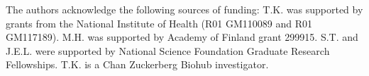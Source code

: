 The authors acknowledge the following sources of funding:
T.K. was supported by grants from the National Institute of Health (R01 GM110089 and R01 GM117189).
M.H. was supported by Academy of Finland grant 299915.
S.T. and J.E.L. were supported by National Science Foundation Graduate Research Fellowships.
T.K. is a Chan Zuckerberg Biohub investigator.
